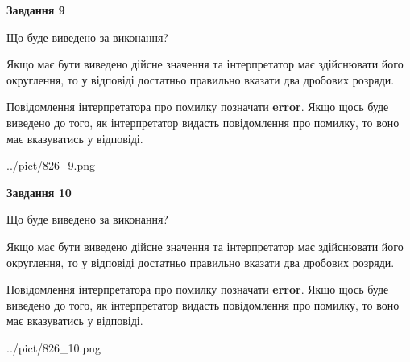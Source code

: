 \documentclass[12pt, ukrainian]{article}
\begin{document}
{\begin {Large}
{\begin {center}\textbf{Завдання 9}\end {center}}\par
Що буде виведено за виконання? \par

Якщо має бути виведено дійсне значення та інтерпретатор має здійснювати його округлення, 
то у відповіді достатньо правильно вказати два дробових розряди.

Повідомлення інтерпретатора про помилку позначати \textbf{error}.
Якщо щось буде виведено до того, як інтерпретатор видасть повідомлення про помилку, 
то воно має вказуватись у відповіді. \par

\begin{center}
	{../pict/826_9.png}
\end{center}
\newpage

{\begin {center}\textbf{Завдання 10}\end {center}}\par
Що буде виведено за виконання? \par

Якщо має бути виведено дійсне значення та інтерпретатор має здійснювати його округлення, 
то у відповіді достатньо правильно вказати два дробових розряди.

Повідомлення інтерпретатора про помилку позначати \textbf{error}.
Якщо щось буде виведено до того, як інтерпретатор видасть повідомлення про помилку, 
то воно має вказуватись у відповіді. \par

\begin{center}
	{../pict/826_10.png}
\end{center}
\newpage

\end {Large}}
\end{document}
